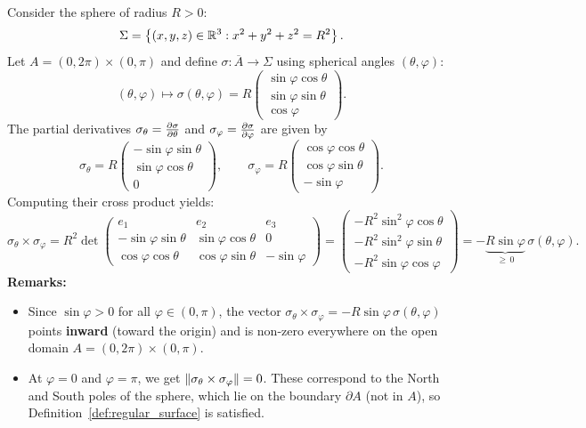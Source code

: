 \begin{exemple}
Consider the sphere of radius $R > 0$:
\[
    \Sigma = \left\{(x,y,z) \in \mathbb{R}^3 : x^2 + y^2 + z^2 = R^2\right\}.
\]
Let $A = (0, 2\pi) \times (0, \pi)$ and define $\sigma : \overline{A} \to \Sigma$ using spherical angles $(\theta, \varphi)$:
\[
    (\theta, \varphi) \mapsto \sigma(\theta, \varphi) = R \begin{pmatrix} \sin\varphi \cos\theta \\ \sin\varphi \sin\theta \\ \cos\varphi \end{pmatrix}.
\]
The partial derivatives $\sigma_\theta = \pdv{\sigma}{\theta}$ and $\sigma_\varphi = \pdv{\sigma}{\varphi}$ are given by
\[
    \sigma_\theta = R \begin{pmatrix} -\sin\varphi \sin\theta \\ \sin\varphi \cos\theta \\ 0 \end{pmatrix}, \qquad
    \sigma_\varphi = R \begin{pmatrix} \cos\varphi \cos\theta \\ \cos\varphi \sin\theta \\ -\sin\varphi \end{pmatrix}.
\]
Computing their cross product yields:
\[
    \sigma_\theta \times \sigma_\varphi = R^2 \det \begin{pmatrix}
        e_1 & e_2 & e_3 \\
        -\sin\varphi \sin\theta & \sin\varphi \cos\theta & 0 \\
        \cos\varphi \cos\theta & \cos\varphi \sin\theta & -\sin\varphi
    \end{pmatrix} = \begin{pmatrix} -R^2 \sin^2\varphi \cos\theta \\ -R^2 \sin^2\varphi \sin\theta \\ -R^2 \sin\varphi \cos\varphi \end{pmatrix} = -\underbrace{R \sin\varphi}_{\ge\,0} \, \sigma(\theta, \varphi).
\]
\textbf{Remarks:}
\begin{itemize}
    \item Since $\sin\varphi > 0$ for all $\varphi \in (0, \pi)$, the vector $\sigma_\theta \times \sigma_\varphi = -R\sin\varphi\,\sigma(\theta, \varphi)$ points \textbf{inward} (toward the origin) and is non-zero everywhere on the open domain $A = (0, 2\pi) \times (0, \pi)$.
    \item At $\varphi = 0$ and $\varphi = \pi$, we get $\left\lVert\sigma_\theta \times \sigma_\varphi\right\rVert = 0$. These correspond to the North and South poles of the sphere, which lie on the boundary $\partial A$ (not in $A$), so Definition~\ref{def:regular_surface} is satisfied.
\end{itemize}
\end{exemple}

